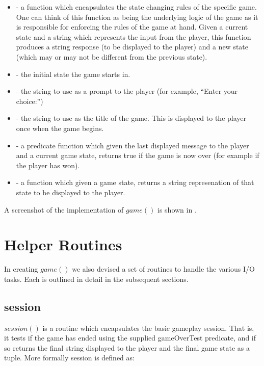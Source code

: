 \begin{itemize}
	\item {} - a function which encapsulates the state changing rules of the specific game.  One can think of this function as being the underlying logic of the game as it is responsible for enforcing the rules of the game at hand.  Given a current state and a string which represents the input from the player, this function produces a string response (to be displayed to the player) and a new state (which may or may not be different from the previous state).
	\item {} - the initial state the game starts in.
	\item {} - the string to use as a prompt to the player (for example, ``Enter your choice:'')
	\item {} - the string to use as the title of the game.  This is displayed to the player once when the game begins.
	\item {} - a predicate function which given the last displayed message to the player and a current game state, returns true if the game is now over (for example if the player has won).
	\item {} - a function which given a game state, returns a string represenation of that state to be displayed to the player.
\end{itemize}

A screenshot of the implementation of \(game()\) is shown in .


\section{Helper Routines}
\label{wordGameHelper}
In creating \(game()\) we also devised a set of routines to handle the various I/O tasks.  Each is outlined in detail in the subsequent sections.

\subsection{session}

\(session()\) is a routine which encapsulates the basic gameplay session.  That is, it tests if the game has ended using the supplied gameOverTest predicate, and if so returns the final string displayed to the player and the final game state as a tuple.  More formally session is defined as:

